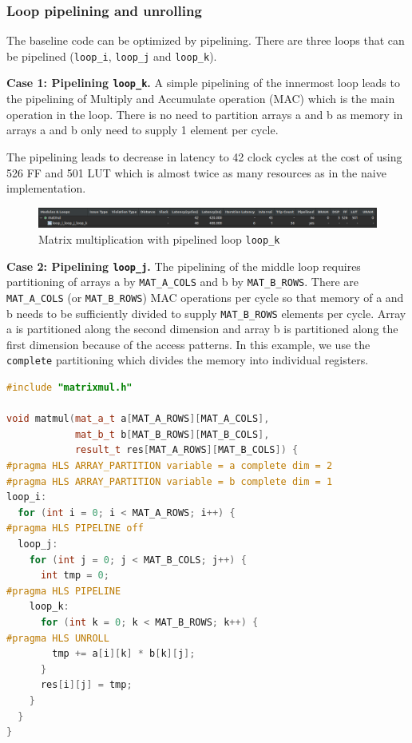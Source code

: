 \documentclass[a4paper, twoside]{report}
\theoremstyle{definition}
\numberwithin{equation}{section}
\begin{document}
\subsubsection{Loop pipelining and unrolling}

The baseline code can be optimized by pipelining.
There are three loops that can be pipelined (\texttt{loop\_i}, \texttt{loop\_j} and \texttt{loop\_k}).

\textbf{Case 1: Pipelining \texttt{loop\_k}.} A simple pipelining of the innermost loop
leads to the pipelining of Multiply and Accumulate operation (MAC) which is the main operation in the loop.
There is no need to partition arrays a and b as memory in arrays a and b only need
to supply 1 element per cycle.

The pipelining leads to decrease in latency to 42 clock cycles at the cost of using
526 FF and 501 LUT which is almost twice as many resources as in the naive implementation.

\begin{figure}[h!]
    \centering
    \includegraphics[width=\textwidth]{matmul_pipek_synth.png}
    \caption{Matrix multiplication with pipelined loop \texttt{loop\_k}}
    \label{fig:matmul_pipek_synth}
\end{figure}

\textbf{Case 2: Pipelining \texttt{loop\_j}.}
The pipelining of the middle loop requires partitioning of arrays a by \texttt{MAT\_A\_COLS} and b by \texttt{MAT\_B\_ROWS}.
There are \texttt{MAT\_A\_COLS} (or \texttt{MAT\_B\_ROWS}) MAC operations per cycle so that
memory of a and b needs to be sufficiently divided to supply \texttt{MAT\_B\_ROWS} elements per cycle.
Array a is partitioned along the second dimension and array b is partitioned along the first dimension
because of the access patterns.
In this example, we use the \texttt{complete} partitioning which divides the memory into
individual registers.


\begin{lstlisting}[language=c++,numbers=none]
#include "matrixmul.h"

void matmul(mat_a_t a[MAT_A_ROWS][MAT_A_COLS],
            mat_b_t b[MAT_B_ROWS][MAT_B_COLS],
            result_t res[MAT_A_ROWS][MAT_B_COLS]) {
#pragma HLS ARRAY_PARTITION variable = a complete dim = 2
#pragma HLS ARRAY_PARTITION variable = b complete dim = 1
loop_i:
  for (int i = 0; i < MAT_A_ROWS; i++) {
#pragma HLS PIPELINE off
  loop_j:
    for (int j = 0; j < MAT_B_COLS; j++) {
      int tmp = 0;
#pragma HLS PIPELINE
    loop_k:
      for (int k = 0; k < MAT_B_ROWS; k++) {
#pragma HLS UNROLL
        tmp += a[i][k] * b[k][j];
      }
      res[i][j] = tmp;
    }
  }
}
\end{lstlisting}
\end{document}
